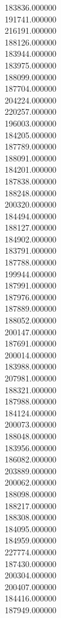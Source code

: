 183836.000000\\
191741.000000\\
216191.000000\\
188126.000000\\
183944.000000\\
183975.000000\\
188099.000000\\
187704.000000\\
204224.000000\\
220257.000000\\
196003.000000\\
184205.000000\\
187789.000000\\
188091.000000\\
184201.000000\\
187838.000000\\
188248.000000\\
200320.000000\\
184494.000000\\
188127.000000\\
184902.000000\\
183791.000000\\
187788.000000\\
199944.000000\\
187991.000000\\
187976.000000\\
187889.000000\\
188052.000000\\
200147.000000\\
187691.000000\\
200014.000000\\
183988.000000\\
207981.000000\\
188321.000000\\
187988.000000\\
184124.000000\\
200073.000000\\
188048.000000\\
183956.000000\\
186082.000000\\
203889.000000\\
200062.000000\\
188098.000000\\
188217.000000\\
188308.000000\\
184095.000000\\
184959.000000\\
227774.000000\\
187430.000000\\
200304.000000\\
200407.000000\\
184416.000000\\
187949.000000\\
